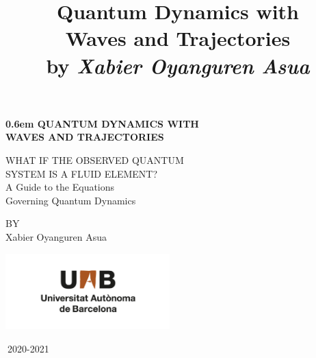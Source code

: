 \documentclass[11pt, a4paper]{article} %
\title{\vspace{-2cm} {\bf Quantum Dynamics  with\\ Waves and Trajectories}\\{\small by {\em Xabier Oyanguren Asua}}\vspace{-0.8cm}}
\date{\vspace{-11ex}}
\begin{document}
\clearpage
\newcommand\nbvspace[1][3]{\vspace*{\stretch{#1}}}
\newcommand\nbstretchyspace{\spaceskip0.5em plus 0.25em minus 0.25em}
\newcommand{\nbtitlestretch}{\spaceskip0.6em}
\pagestyle{empty}
\begin{center}
\bfseries
\nbvspace[1]
\Huge
{\nbtitlestretch\huge
QUANTUM DYNAMICS WITH \\ WAVES AND TRAJECTORIES}

\nbvspace[1]
\normalsize

WHAT IF THE OBSERVED QUANTUM\\
SYSTEM IS A FLUID ELEMENT?\\
\nbvspace[1]
A Guide to the Equations \\Governing Quantum Dynamics

\nbvspace[1]
\small BY\\
\Large Xabier Oyanguren Asua\\[0.5em]


\nbvspace[6]

\includegraphics[width=2.5in]{UAB.png}
\normalsize
\vspace{-0.5cm}

\large
\small
\small
$\ $2020-2021 
\nbvspace[1]
\end{center}
\clearpage
\maketitle
{}
\setlength{\cftbeforesecskip}{0.4cm}
\setlength{\cftbeforesubsecskip}{0.4cm}
\setlength{\cftbeforesubsubsecskip}{0.25cm}
\end{document}
